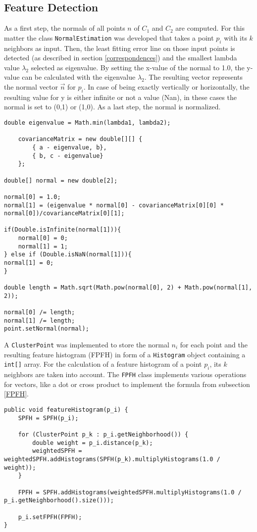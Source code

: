 \subsection{Feature Detection}
As a first step, the normals of all points $n$ of $C_1$ and $C_2$ are computed. For this matter the class \texttt{NormalEstimation} was developed that takes a point $p_i$ with its $k$ neighbors as input. Then, the least fitting error line on those input points is detected (as described in section \ref{correspondences}) and the smallest lambda value $\lambda_2$ selected as eigenvalue. By setting the x-value of the normal to 1.0, the y-value can be calculated with the eigenvalue $\lambda_2$. The resulting vector represents the normal vector $\vec{n}$ for $p_i$. In case of being exactly vertically or horizontally, the resulting value for y is either infinite or not a value (Nan), in these cases the normal is set to (0,1) or (1,0). As a last step, the normal is normalized.
\begin{lstlisting}
double eigenvalue = Math.min(lambda1, lambda2);

	covarianceMatrix = new double[][] { 
		{ a - eigenvalue, b},
		{ b, c - eigenvalue}
	};

double[] normal = new double[2];

normal[0] = 1.0;
normal[1] = (eigenvalue * normal[0] - covarianceMatrix[0][0] * normal[0])/covarianceMatrix[0][1];

if(Double.isInfinite(normal[1])){
	normal[0] = 0;
	normal[1] = 1;
} else if (Double.isNaN(normal[1])){
normal[1] = 0;
}

double length = Math.sqrt(Math.pow(normal[0], 2) + Math.pow(normal[1], 2));
		
normal[0] /= length;
normal[1] /= length;
point.setNormal(normal);
\end{lstlisting}
A \texttt{ClusterPoint} was implemented to store the normal $n_i$ for each point and the resulting feature histogram (FPFH) in form of a \texttt{Histogram} object containing a \texttt{int[]} array. For the calculation of a feature histogram of a point $p_i$, its $k$ neighbors are taken into account. The \texttt{FPFH} class implements various operations for vectors, like a dot or cross product to implement the formula from subsection \ref{FPFH}.
\begin{lstlisting}
public void featureHistogram(p_i) {
	SPFH = SPFH(p_i);

	for (ClusterPoint p_k : p_i.getNeighborhood()) {
		double weight = p_i.distance(p_k);
		weightedSPFH = weightedSPFH.addHistograms(SPFH(p_k).multiplyHistograms(1.0 / weight));
	}
	
	FPFH = SPFH.addHistograms(weightedSPFH.multiplyHistograms(1.0 / p_i.getNeighborhood().size()));
	
	p_i.setFPFH(FPFH);
}
\end{lstlisting}
